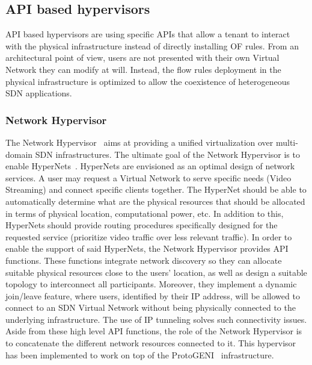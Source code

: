 \subsection{API based hypervisors}
API based hypervisors are using specific APIs that allow a tenant to interact with the physical infrastructure instead of directly installing OF rules.
From an architectural point of view, users are not presented with their own Virtual Network they can modify at will. Instead, the flow rules deployment in the physical infrastructure is optimized to allow the coexistence of heterogeneous SDN applications.


\subsubsection{Network Hypervisor}
The Network Hypervisor~\cite{NetworkHypervisor-Huang2013} aims at providing a unified virtualization over multi-domain SDN infrastructures. 
The ultimate goal of the Network Hypervisor is to enable HyperNets~\cite{HyperNet-Huang2013a}. HyperNets are envisioned as an optimal design of network services. A user may request a Virtual Network to serve specific needs (\eg Video Streaming) and connect specific clients together.
The HyperNet should be able to automatically determine what are the physical resources that should be allocated in terms of physical location, computational power, etc. In addition to this, HyperNets should provide routing procedures specifically designed for the requested service (\ie prioritize video traffic over less relevant traffic).
In order to enable the support of said HyperNets, the Network Hypervisor provides API functions. These functions integrate network discovery so they can allocate suitable physical resources close to the users' location, as well as design a suitable topology to interconnect all participants.
Moreover, they implement a dynamic join/leave feature, where users, identified by their IP address, will be allowed to connect to an SDN Virtual Network without being physically connected to the underlying infrastructure. The use of IP tunneling solves such connectivity issues.
Aside from these high level API functions, the role of the Network Hypervisor is to concatenate the different network resources connected to it.
This hypervisor has been implemented to work on top of the ProtoGENI~\cite{protoGENI} infrastructure.


